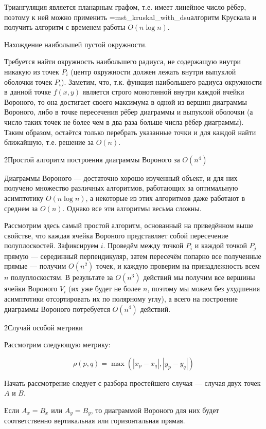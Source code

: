 {Триангуляция является планарным графом, т.е. имеет линейное число рёбер, поэтому к ней можно применить \algohref=mst_kruskal_with_dsu{алгоритм Крускала} и получить алгоритм с временем работы $O(n \log n)$.

\li Нахождение наибольшей пустой окружности.

Требуется найти окружность наибольшего радиуса, не содержащую внутри никакую из точек $P_i$ (центр окружности должен лежать внутри выпуклой оболочки точек $P_i$). Заметим, что, т.к. функция наибольшего радиуса окружности в данной точке $f(x,y)$ является строго монотонной внутри каждой ячейки Вороного, то она достигает своего максимума в одной из вершин диаграммы Вороного, либо в точке пересечения рёбер диаграммы и выпуклой оболочки (а число таких точек не более чем в два раза больше числа рёбер диаграммы). Таким образом, остаётся только перебрать указанные точки и для каждой найти ближайшую, т.е. решение за $O(n)$.

}

\h2{Простой алгоритм построения диаграммы Вороного за $O(n^4)$}

Диаграммы Вороного --- достаточно хорошо изученный объект, и для них получено множество различных алгоритмов, работающих за оптимальную асимптотику $O (n \log n)$, а некоторые из этих алгоритмов даже работают в среднем за $O (n)$. Однако все эти алгоритмы весьма сложны.

Рассмотрим здесь самый простой алгоритм, основанный на приведённом выше свойстве, что каждая ячейка Вороного представляет собой пересечение полуплоскостей. Зафиксируем $i$. Проведём между точкой $P_i$ и каждой точкой $P_j$ прямую --- серединный перпендикуляр, затем пересечём попарно все полученные прямые --- получим $O(n^2)$ точек, и каждую проверим на принадлежность всем $n$ полуплоскостям. В результате за $O(n^3)$ действий мы получим все вершины ячейки Вороного $V_i$ (их уже будет не более $n$, поэтому мы можем без ухудшения асимптотики отсортировать их по полярному углу), а всего на построение диаграммы Вороного потребуется $O(n^4)$ действий.

\h2{Случай особой метрики}

Рассмотрим следующую метрику:

$$ \rho(p,q) = \max (|x_p-x_q|, |y_p-y_q|) $$

Начать рассмотрение следует с разбора простейшего случая --- случая двух точек $A$ и $B$.

Если $A_x=B_x$ или $A_y=B_y$, то диаграммой Вороного для них будет соответственно вертикальная или горизонтальная прямая.

